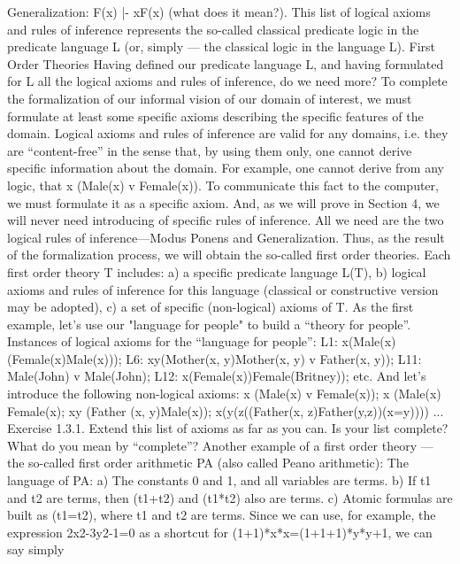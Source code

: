 Generalization: F(x) |- \forall xF(x) (what does it mean?).
This list of logical axioms and rules of inference represents the so-called classical predicate logic in the
predicate language L (or, simply --- the classical logic in the language L).
First Order Theories
Having defined our predicate language L, and having formulated for L all the logical axioms and rules of
inference, do we need more?
To complete the formalization of our informal vision of our domain of interest, we must formulate at least
some specific axioms describing the specific features of the domain. Logical axioms and rules of
inference are valid for any domains, i.e. they are ``content-free'' in the sense that, by using them only, one
cannot derive specific information about the domain.
For example, one cannot derive from any logic, that \forall x (Male(x) v Female(x)). To communicate this fact
to the computer, we must formulate it as a specific axiom.
And, as we will prove in Section 4, we will never need introducing of specific rules of inference. All we
need are the two logical rules of inference---Modus Ponens and Generalization.
Thus, as the result of the formalization process, we will obtain the so-called first order theories.
Each first order theory T includes:
a) a specific predicate language L(T),
b) logical axioms and rules of inference for this language (classical or constructive version may be
adopted),
c) a set of specific (non-logical) axioms of T.
As the first example, let's use our "language for people" to build a ``theory for people''.
Instances of logical axioms for the ``language for people'':
L1: \forall x(Male(x)\IMPLIES (Female(x)\IMPLIES Male(x)));
L6: \forall x\forall y(Mother(x, y)\IMPLIES Mother(x, y) v Father(x, y));
L11: Male(John) v \neg Male(John);
L12: \forall x(Female(x))\IMPLIES Female(Britney));
etc.
And let's introduce the following non-logical axioms:
\forall x (Male(x) v Female(x));
\forall x \neg (Male(x) \AND  Female(x);
\forall x\forall y (Father (x, y)\IMPLIES Male(x));
\forall x(\forall y(\forall z((Father(x, z)\AND Father(y,z))\IMPLIES (x=y)))) ...
Exercise 1.3.1. Extend this list of axioms as far as you can. Is your list complete? What do you mean by ``complete''?
Another example of a first order theory --- the so-called first order arithmetic PA (also called Peano arithmetic):
The language of PA:
a) The constants 0 and 1, and all variables are terms.
b) If t1 and t2 are terms, then (t1+t2) and (t1*t2) also are terms.
c) Atomic formulas are built as (t1=t2), where t1 and t2 are terms.
Since we can use, for example, the expression 2x2-3y2-1=0 as a shortcut for (1+1)*x*x=(1+1+1)*y*y+1, we can say simply
